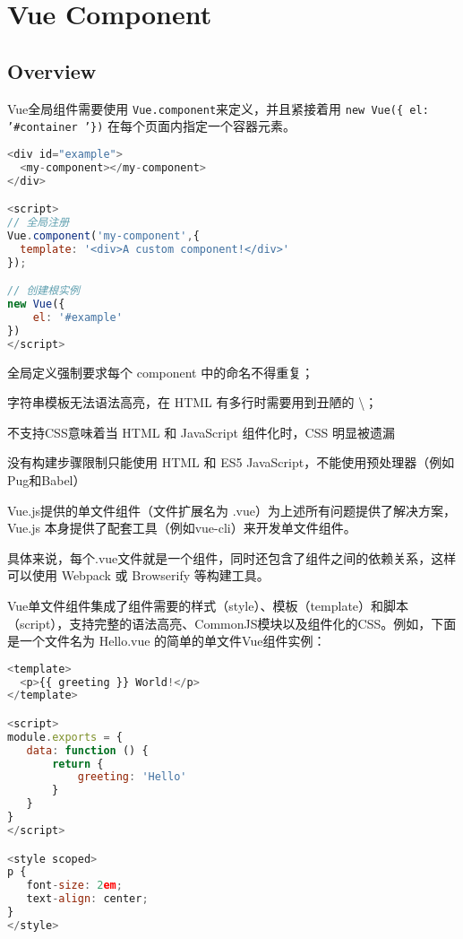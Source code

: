 \part{Vue Component}


\chapter{Overview}




Vue全局组件需要使用 \texttt{Vue.component}来定义，并且紧接着用 \texttt{new Vue(\{ el: '\#container '\})} 在每个页面内指定一个容器元素。



\begin{lstlisting}[language=JavaScript]
<div id="example">
  <my-component></my-component>
</div>

<script>
// 全局注册
Vue.component('my-component',{
  template: '<div>A custom component!</div>'
});

// 创建根实例
new Vue({
    el: '#example'
})
</script>
\end{lstlisting}

\begin{compactitem}
\item 全局定义强制要求每个 component 中的命名不得重复；
\item 字符串模板无法语法高亮，在 HTML 有多行时需要用到丑陋的 \textbackslash；
\item 不支持CSS意味着当 HTML 和 JavaScript 组件化时，CSS 明显被遗漏
\item 没有构建步骤限制只能使用 HTML 和 ES5 JavaScript，不能使用预处理器（例如Pug和Babel）
\end{compactitem}



Vue.js提供的单文件组件（文件扩展名为 .vue）为上述所有问题提供了解决方案，Vue.js 本身提供了配套工具（例如vue-cli）来开发单文件组件。

具体来说，每个.vue文件就是一个组件，同时还包含了组件之间的依赖关系，这样可以使用 Webpack 或 Browserify 等构建工具。

Vue单文件组件集成了组件需要的样式（style）、模板（template）和脚本（script），支持完整的语法高亮、CommonJS模块以及组件化的CSS。例如，下面是一个文件名为 Hello.vue 的简单的单文件Vue组件实例：

\begin{lstlisting}[language=JavaScript]
<template>
  <p>{{ greeting }} World!</p>
</template>

<script>
module.exports = {
   data: function () {
       return {
           greeting: 'Hello'
       }
   }
}
</script>

<style scoped>
p {
   font-size: 2em;
   text-align: center;
}
</style>
\end{lstlisting}




